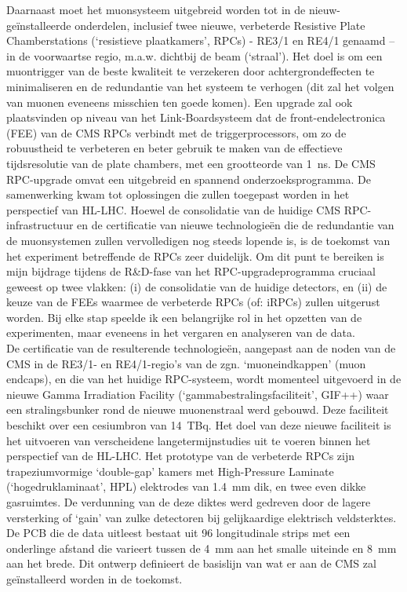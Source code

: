 	Daarnaast moet het muonsysteem uitgebreid worden tot in de nieuw-geïnstalleerde onderdelen, inclusief twee nieuwe, verbeterde Resistive Plate Chamberstations (‘resistieve plaatkamers’, RPCs) - RE3/1 en RE4/1 genaamd – in de voorwaartse regio, m.a.w. dichtbij de beam (‘straal’). Het doel is om een muontrigger van de beste kwaliteit te verzekeren door achtergrondeffecten te minimaliseren en de redundantie van het systeem te verhogen (dit zal het volgen van muonen eveneens misschien ten goede komen). Een upgrade zal ook plaatsvinden op niveau van het Link-Boardsysteem dat de front-endelectronica (FEE) van de CMS RPCs verbindt met de triggerprocessors, om zo de robuustheid te verbeteren en beter gebruik te maken van de effectieve tijdsresolutie van de plate chambers, met een grootteorde van \SI{1}{ns}. De CMS RPC-upgrade omvat een uitgebreid en spannend onderzoeksprogramma. De samenwerking kwam tot oplossingen die zullen toegepast worden in het perspectief van HL-LHC. Hoewel de consolidatie van de huidige CMS RPC-infrastructuur en de certificatie van nieuwe technologieën die de redundantie van de muonsystemen zullen vervolledigen nog steeds lopende is, is de toekomst van het experiment betreffende de RPCs zeer duidelijk. Om dit punt te bereiken is mijn bijdrage tijdens de R\&D-fase van het RPC-upgradeprogramma cruciaal geweest op twee vlakken: (i) de consolidatie van de huidige detectors, en (ii) de keuze van de FEEs waarmee de verbeterde RPCs (of: iRPCs) zullen uitgerust worden. Bij elke stap speelde ik een belangrijke rol in het opzetten van de experimenten, maar eveneens in het vergaren en analyseren van de data.\\
	De certificatie van de resulterende technologieën, aangepast aan de noden van de CMS in de RE3/1- en RE4/1-regio’s van de zgn. ‘muoneindkappen’ (muon endcaps), en die van het huidige RPC-systeem, wordt momenteel uitgevoerd in de nieuwe Gamma Irradiation Facility (‘gammabestralingsfaciliteit’, GIF++) waar een stralingsbunker rond de nieuwe muonenstraal werd gebouwd. Deze faciliteit beschikt over een cesiumbron van \SI{14}{TBq}. Het doel van deze nieuwe faciliteit is het uitvoeren van verscheidene langetermijnstudies uit te voeren binnen het perspectief van de HL-LHC. Het prototype van de verbeterde RPCs zijn trapeziumvormige ‘double-gap’ kamers met High-Pressure Laminate (‘hogedruklaminaat’, HPL) elektrodes van \SI{1.4}{mm} dik, en twee even dikke gasruimtes. De verdunning van de deze diktes werd gedreven door de lagere versterking of ‘gain’ van zulke detectoren bij gelijkaardige elektrisch veldsterktes. De PCB die de data uitleest bestaat uit 96 longitudinale strips met een onderlinge afstand die varieert tussen de \SI{4}{mm} aan het smalle uiteinde en \SI{8}{mm} aan het brede. Dit ontwerp definieert de basislijn van wat er aan de CMS zal geïnstalleerd worden in de toekomst.\vspace*{5mm}
	
